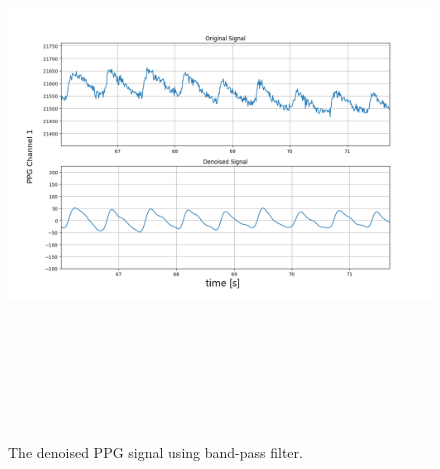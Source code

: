 \begin{figure}[htpb]
	\centering
	\includegraphics[width=15cm,height=15cm,keepaspectratio=true]{images/ppg_orig_denoised.png}
	\caption{
		The denoised PPG signal using band-pass filter.
	}
	\label{fig:ppg_bandpass_denoised}
\end{figure}
